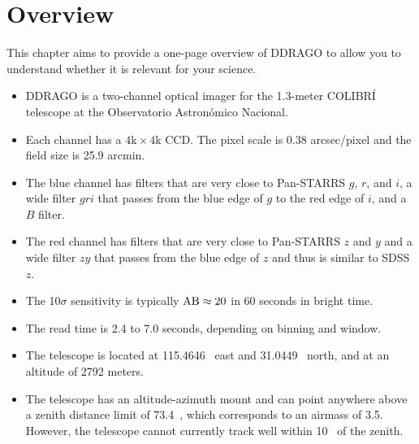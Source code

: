 \chapter{Overview}
\label{chapter:overview}

This chapter aims to provide a one-page overview of DDRAGO to allow you to understand whether it is relevant for your science.

\begin{itemize}
    \item DDRAGO is a two-channel optical imager for the 1.3-meter COLIBRÍ telescope at the Observatorio Astronómico Nacional.
    
    \item Each channel has a $4\mathrm{k}\times4\mathrm{k}$ CCD. The pixel scale is 0.38 \unit{arcsec/pixel} and the field size is 25.9 \unit{arcmin}.

    \item The blue channel has filters that are very close to Pan-STARRS $g$, $r$, and $i$, a wide filter $gri$ that passes from the blue edge of $g$ to the red edge of $i$, and a $B$ filter. 
    
    \item The red channel has filters that are very close to Pan-STARRS $z$ and $y$ and a wide filter $zy$ that passes from the blue edge of $z$ and thus is similar to SDSS $z$.
    
    \item The 10$\sigma$ sensitivity is typically $\mbox{AB} \approx 20$ in 60 seconds in bright time.

    \item The read time is 2.4 to 7.0 seconds, depending on binning and window.
    
    \item The telescope is located at 115.4646~{\deg} east and 31.0449~{\deg} north, and at an altitude of 2792 meters.

    \item The telescope has an altitude-azimuth mount and can point anywhere above a zenith distance limit of 73.4~{\deg}, which corresponds to an airmass of 3.5. However, the telescope cannot currently track well within 10~{\deg} of the zenith.

\end{itemize}
